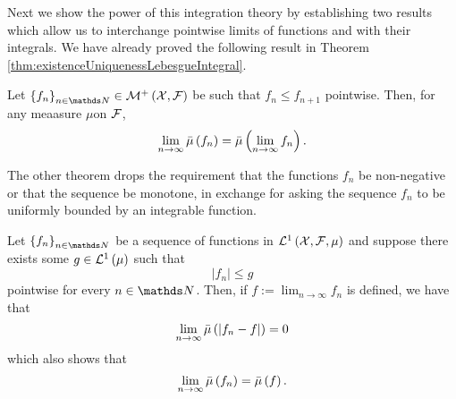 Next we show the power of this integration theory by establishing
two results which allow us to interchange pointwise limits of functions
and with their integrals. We have already proved the following result
in Theorem \ref{thm:existenceUniquenessLebesgueIntegral}.
\begin{thm}
\label{thm:monotoneConvergenceLebInt}Let $\left\{ f_{n}\right\} _{n\in\N}\in\nonnegMeasurableFunctions$
be such that $f_{n}\leq f_{n+1}$ pointwise. Then, for any meaasure
$\mu$on $\mathcal{F}$,
\[
\lim_{n\to\infty}\bar{\mu}\left(f_{n}\right)=\bar{\mu}\left(\lim_{n\to\infty}f_{n}\right).
\]
\end{thm}

The other theorem drops the requirement that the functions $f_{n}$
be non-negative or that the sequence be monotone, in exchange for
asking the sequence $f_{n}$ to be uniformly bounded by an integrable
function.
\begin{thm}
\label{thm:dominatedConvergenceLebInt}Let $\left\{ f_{n}\right\} _{n\in\N}$
be a sequence of functions in $\mathcal{L}^{1}\left(\mathcal{X},\mathcal{F},\mu\right)$ and suppose there
exists some $g\in\mathcal{L}^{1}\left(\mu\right)$ such that
\[
\left|f_{n}\right|\leq g
\]
pointwise for every $n\in\N$. Then, if $f:=\lim_{n\to\infty}f_{n}$
is defined, we have that
\[
\lim_{n\to\infty}\bar{\mu}\left(\left|f_{n}-f\right|\right)=0
\]
which also shows that
\[
\lim_{n\to\infty}\bar{\mu}\left(f_{n}\right)=\bar{\mu}\left(f\right).
\]
\end{thm}

